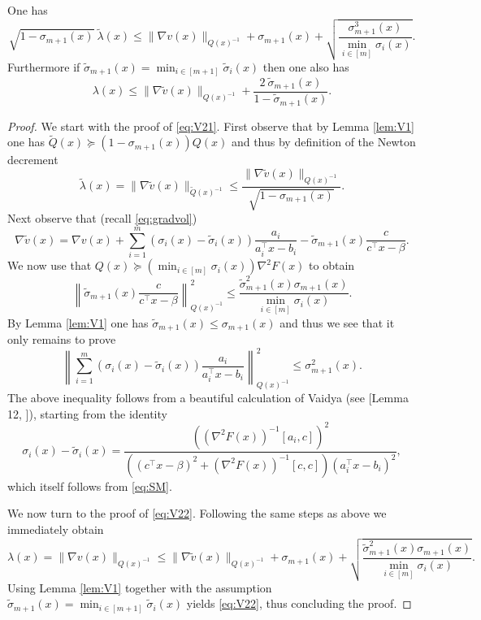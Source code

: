 \begin{lemma} \label{lem:V2}
One has
\begin{equation} \label{eq:V21}
\sqrt{1- \sigma_{m+1}(x)} \ \tilde{\lambda} (x) \leq \|\nabla {v}(x)\|_{Q(x)^{-1}} + \sigma_{m+1}(x) + \sqrt{\frac{\sigma_{m+1}^3(x)}{\min_{i \in [m]} \sigma_i(x)}} .
\end{equation}
Furthermore if $\tilde{\sigma}_{m+1}(x) = \min_{i \in [m+1]} \tilde{\sigma}_{i}(x)$ then one also has
\begin{equation} \label{eq:V22}
\lambda(x) \leq  \|\nabla \tilde{v}(x)\|_{Q(x)^{-1}} + \frac{2 \ \tilde{\sigma}_{m+1}(x)}{1 - \tilde{\sigma}_{m+1}(x)} .
\end{equation}
\end{lemma}

\begin{proof}
We start with the proof of \eqref{eq:V21}. First observe that by Lemma \ref{lem:V1} one has $\tilde{Q}(x) \succeq (1-\sigma_{m+1}(x)) Q(x)$ and thus by definition of the Newton decrement
$$\tilde{\lambda} (x) = \|\nabla \tilde{v}(x)\|_{\tilde{Q}(x)^{-1}} \leq \frac{\|\nabla \tilde{v}(x)\|_{Q(x)^{-1}}}{\sqrt{1-\sigma_{m+1}(x)}} .$$
Next observe that (recall \eqref{eq:gradvol})
$$ \nabla \tilde{v}(x) = \nabla v(x) + \sum_{i=1}^m ({\sigma}_i(x) - \tilde{\sigma}_i(x)) \frac{a_i}{a_i^{\top} x - b_i} - \tilde{\sigma}_{m+1}(x) \frac{c}{c^{\top} x - \beta} .$$
We now use that $Q(x) \succeq (\min_{i \in [m]} \sigma_i(x)) \nabla^2 F(x)$ to obtain 
$$\left \| \tilde{\sigma}_{m+1}(x) \frac{c}{c^{\top} x - \beta} \right\|_{Q(x)^{-1}}^2 \leq \frac{\tilde{\sigma}_{m+1}^2(x) \sigma_{m+1}(x)}{\min_{i \in [m]} \sigma_i(x)} .$$
By Lemma \ref{lem:V1} one has $\tilde{\sigma}_{m+1}(x) \leq {\sigma}_{m+1}(x)$ and thus we see that it only remains to prove 
$$\left\|\sum_{i=1}^m ({\sigma}_i(x) - \tilde{\sigma}_i(x)) \frac{a_i}{a_i^{\top}x - b_i} \right\|_{Q(x)^{-1}}^2 \leq \sigma_{m+1}^2(x) .$$
The above inequality follows from a beautiful calculation of Vaidya (see [Lemma 12, \cite{Vai96}]), starting from the identity
$$\sigma_i(x) - \tilde{\sigma}_i(x) = \frac{((\nabla^2 F(x))^{-1}[a_i,c])^2}{((c^{\top} x - \beta)^2 + (\nabla^2 F(x))^{-1}[c,c])(a_i^{\top} x - b_i)^2} ,$$
which itself follows from \eqref{eq:SM}.
\newline

We now turn to the proof of \eqref{eq:V22}. Following the same steps as above we immediately obtain
$$\lambda(x) = \|\nabla v(x)\|_{Q(x)^{-1}} \leq \|\nabla \tilde{v}(x)\|_{Q(x)^{-1}} + \sigma_{m+1}(x) + \sqrt{\frac{\tilde{\sigma}_{m+1}^2(x) \sigma_{m+1}(x)}{\min_{i \in [m]} \sigma_i(x)}} .$$
Using Lemma \ref{lem:V1} together with the assumption $\tilde{\sigma}_{m+1}(x) = \min_{i \in [m+1]} \tilde{\sigma}_{i}(x)$ yields \eqref{eq:V22}, thus concluding the proof.
\end{proof}

